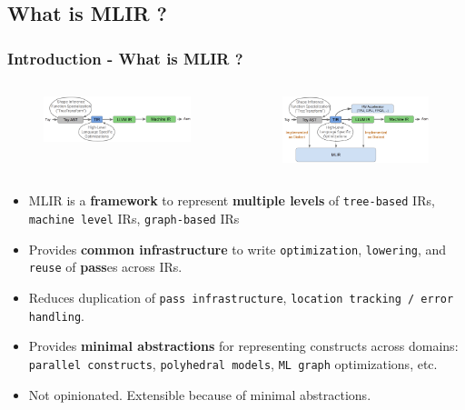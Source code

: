 \documentclass{beamer}
\begin{document}
\subsection{What is MLIR ?}
\begin{frame}
  \frametitle{Introduction - What is MLIR ?}
  \begin{columns}
    \begin{column}{0.5\textwidth}
      \begin{figure}[h]
        \centering
        \includegraphics[width=\textwidth]{pictures/toyir.png}
      \end{figure}
    \end{column}
    \vrule
    \begin{column}{0.5\textwidth}
      \begin{figure}[h]
        \centering
        \includegraphics[width=\textwidth]{pictures/toymlir.png}
      \end{figure}
    \end{column}
  \end{columns}
  \vspace{0.5cm}
  \footnotesize
  \begin{itemize}
    \footnotesize
    \itemsep0.4em 
    \item MLIR is a \textbf{framework} to represent \textbf{multiple levels} of \texttt{tree-based} IRs, \texttt{machine level} IRs, \texttt{graph-based} IRs
    \item Provides \textbf{common infrastructure} to write \texttt{optimization}, \texttt{lowering}, and \texttt{reuse} of \textbf{pass}es across IRs.
    \item Reduces duplication of \texttt{pass infrastructure}, \texttt{location tracking / error handling}.
    \item Provides \textbf{minimal abstractions} for representing constructs across domains: \texttt{parallel constructs}, \texttt{polyhedral models}, 
    \texttt{ML graph} optimizations, etc.
    \item Not opinionated. Extensible because of minimal abstractions.
  \end{itemize}
\end{frame}
\end{document}
